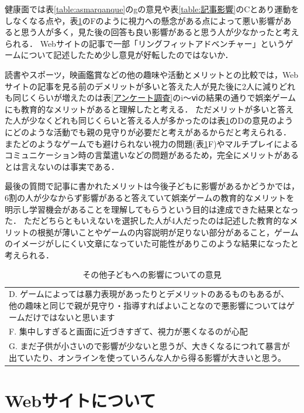 \documentclass[12pt,a4j,titlepage]{ltjsarticle}
\begin{document}
健康面では表\ref{table:asmarqanque}のgの意見や表\ref{table:記事影響}のCとあり運動をしなくなる点や，表\ref{table:その他意見}のFのように視力への懸念がある点によって悪い影響があると思う人が多く，見た後の回答も良い影響があると思う人が少なかったと考えられる．
Webサイトの記事で一部「リングフィットアドベンチャー」というゲームについて記述したため少し意見が好転したのではないか．

読書やスポーツ，映画鑑賞などの他の趣味や活動とメリットとの比較では，Webサイトの記事を見る前のデメリットが多いと答えた人が見た後に2人に減りどれも同じくらいが増えたのは表\ref{アンケート調査}のi～ⅵの結果の通りで娯楽ゲームにも教育的なメリットがあると理解したと考える．
ただメリットが多いと答えた人が少なくどれも同じくらいと答える人が多かったのは表\ref{table:その他意見}のDの意見のようにどのような活動でも親の見守りが必要だと考えがあるからだと考えられる．
またどのようなゲームでも避けられない視力の問題(表\ref{table:その他意見}F)やマルチプレイによるコミュニケーション時の言葉遣いなどの問題があるため，完全にメリットがあるとは言えないのは事実である．

最後の質問で記事に書かれたメリットは今後子どもに影響があるかどうかでは，6割の人が少なからず影響があると答えていて娯楽ゲームの教育的なメリットを明示し学習機会があることを理解してもらうという目的は達成できた結果となった．
ただどちらともいえないを選択した人が4人だったのは記述した教育的なメリットの根拠が薄いことやゲームの内容説明が足りない部分があること，ゲームのイメージがしにくい文章になっていた可能性がありこのような結果になったと考えられる．

\begin{table}[H]
 \caption{その他子どもへの影響についての意見}
 \label{table:その他意見}
 \small
 \centering
  \begin{tabular}{l}
  \hline
   D. ゲームによっては暴力表現があったりとデメリットのあるものもあるが、他の趣味と同じで親が見守り・指導すればよいことなので悪影響についてはゲームだけではないと思います\\
   F. 集中しすぎると画面に近づきすぎて、視力が悪くなるのが心配 \\
   G. まだ子供が小さいので影響が少ないと思うが、大きくなるにつれて暴言が出ていたり、オンラインを使っていろんな人から得る影響が大きいと思う。 \\
   \hline
  \end{tabular}
\end{table}

\clearpage
\section{Webサイトについて}\label{Webサイトについて}
\end{document}
